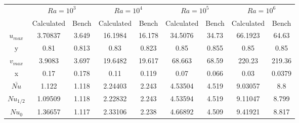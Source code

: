 \begin{table}[h]
	\centering
	\begin{tabular}{c|c|c|c|c|c|c|c|c|}
		\cline{2-9}
		\multicolumn{1}{l|}{}       & \multicolumn{2}{c|}{$Ra=10^{3}$} & \multicolumn{2}{c|}{$Ra=10^{4}$} & \multicolumn{2}{c|}{$Ra=10^{5}$} & \multicolumn{2}{c|}{$Ra=10^{6}$} \\ \cline{2-9} 
		\multicolumn{1}{l|}{}       & Calculated                & Bench                & Calculated                & Bench                & Calculated                & Bench                & Calculated                & Bench                \\ \hline
		\multicolumn{1}{|c|}{$u_{max}$}  & 3.70837                   & 3.649                & 16.1984                   & 16.178               & 34.5076                   & 34.73                & 66.1923                   & 64.63                \\ \hline
		\multicolumn{1}{|c|}{y}     & 0.81                      & 0.813                & 0.83                      & 0.823                & 0.85                      & 0.855                & 0.85                      & 0.85                 \\ \hline
		\multicolumn{1}{|c|}{$v_{max}$}  & 3.9083                    & 3.697                & 19.6482                   & 19.617               & 68.663                    & 68.59                & 220.23                    & 219.36               \\ \hline
		\multicolumn{1}{|c|}{x}     & 0.17                      & 0.178                & 0.11                      & 0.119                & 0.07                      & 0.066                & 0.03                      & 0.0379               \\ \hline
		\multicolumn{1}{|c|}{$\bar{Nu}$} & 1.122                     & 1.118                & 2.24403                   & 2.243                & 4.53504                   & 4.519                & 9.03057                   & 8.8                  \\ \hline
		\multicolumn{1}{|c|}{$Nu_{1/2}$}  & 1.09509                   & 1.118                & 2.22832                   & 2.243                & 4.53594                   & 4.519                & 9.11047                   & 8.799                \\ \hline
		\multicolumn{1}{|c|}{$Nu_{0}$}   & 1.36657                   & 1.117                & 2.33106                   & 2.238                & 4.66892                   & 4.509                & 9.41921                   & 8.817                \\ \hline

\end{tabular}
\end{table}
